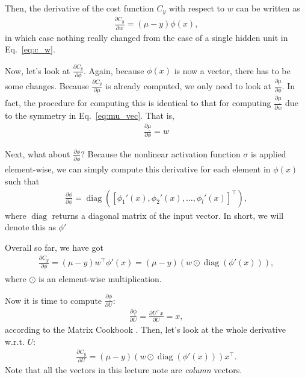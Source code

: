 \documentclass{report}
\newcommand{\diag}[0]{\operatorname{diag}}
\begin{document}
Then, the derivative of the cost function $C_y$ with respect to $w$ can be
written as
\begin{align*}
    \frac{\partial C_y}{\partial w} = (\mu -y) \phi(x),
\end{align*}
in which case nothing really changed from the case of a single hidden unit in
Eq.~\eqref{eq:c_w}.

Now, let's look at $\frac{\partial C_y}{\partial \phi}$. Again, because
$\phi(x)$ is now a vector, there has to be some changes. Because $\frac{\partial
C_y}{\partial \underline{\mu}}$ is already computed, we only need to look at
$\frac{\partial \underline{\mu}}{\partial \phi}$. In fact, the procedure for
computing this is identical to that for computing $\frac{\partial
\underline{\mu}}{\partial w}$ due to the symmetry in Eq.~\eqref{eq:mu_vec}. That
is,
\begin{align*}
    \frac{\partial \underline{\mu}}{\partial \phi} = w
\end{align*}

Next, what about $\frac{\partial \phi}{\partial \underline{\phi}}$? Because the
nonlinear activation function $\sigma$ is applied element-wise, we can simply
compute this derivative for each element in $\phi(x)$ such that
\begin{align*}
    \frac{\partial \phi}{\partial \underline{\phi}} = 
    \diag\left(\left[ \phi_1'(x), \phi_2'(x), \ldots, \phi_l'(x)
    \right]^\top\right),
\end{align*}
where $\diag$ returns a diagonal matrix of the input vector. In short, we will
denote this as $\phi'$

Overall so far, we have got
\begin{align*}
    \frac{\partial C_y}{\partial \underline{\phi}} = 
    (\mu - y)w^\top \phi'(x) = (\mu - y) (w \odot \diag(\phi'(x))),
\end{align*}
where $\odot$ is an element-wise multiplication.

Now it is time to compute $\frac{\partial
\underline{\phi}}{\partial U}$:
\begin{align*}
    \frac{\partial \underline{\phi}}{\partial U} = \frac{\partial U^\top
    x}{\partial U} = x,
\end{align*}
according to the Matrix Cookbook \citep{petersen2008matrix}. Then, let's look at
the whole derivative w.r.t. $U$:
\begin{align*}
    \frac{\partial C_y}{\partial U} = (\mu - y) (w \odot \diag(\phi'(x)))
    x^\top.
\end{align*}
Note that all the vectors in this lecture note are {\em column} vectors.
\end{document}
